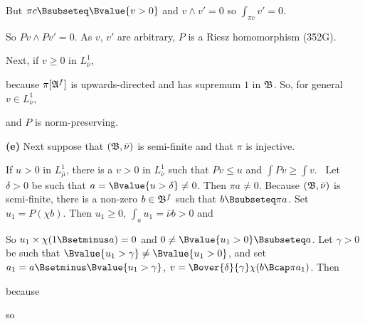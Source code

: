 {
     
\noindent But $\pi c\Bsubseteq\Bvalue{v>0}$ and $v\wedge v'=0$ so
$\int_{\pi c}v'=0$.\ \Bang
     
So $Pv\wedge Pv'=0$.   As $v$, $v'$ are arbitrary, $P$ is a Riesz
homomorphism (352G).
     
Next, if $v\ge 0$ in $L^1_{\bar\nu}$,
     
     
\noindent because $\pi[\frak A^f]$ is upwards-directed and has supremum
$1$ in $\frak B$.   So, for general $v\in L^1_{\bar\nu}$,
     
     
\noindent and $P$ is norm-preserving.
     
\medskip
     
{\bf (e)} Next suppose that $(\frak B,\bar\nu)$ is semi-finite and that
$\pi$ is injective.
     
\medskip
     
 If $u>0$ in $L^1_{\bar\mu}$, there is a $v>0$ in
$L^1_{\bar\nu}$ such that $Pv\le u$ and $\int Pv\ge\int v$.   \Prf\ Let
$\delta>0$ be such that
$a=\Bvalue{u>\delta}\ne 0$.   Then $\pi a\ne 0$.   Because $(\frak
B,\bar\nu)$ is semi-finite, there is a non-zero $b\in\frak B^f$ such
that $b\Bsubseteq \pi a$.   Set $u_1=P(\chi b)$.   Then $u_1\ge 0$,
$\int_au_1=\bar\nu b>0$ and
     
     
\noindent So $u_1\times\chi(1\Bsetminus a)=0$ and
$0\ne\Bvalue{u_1>0}\Bsubseteq a$.
Let $\gamma>0$ be such that $\Bvalue{u_1>\gamma}\ne\Bvalue{u_1>0}$, and
set $a_1=a\Bsetminus\Bvalue{u_1>\gamma}$,
$v=\Bover{\delta}{\gamma}\chi(b\Bcap\pi a_1)$.   Then
     
     
\noindent because
     
     
\noindent so
     
}
